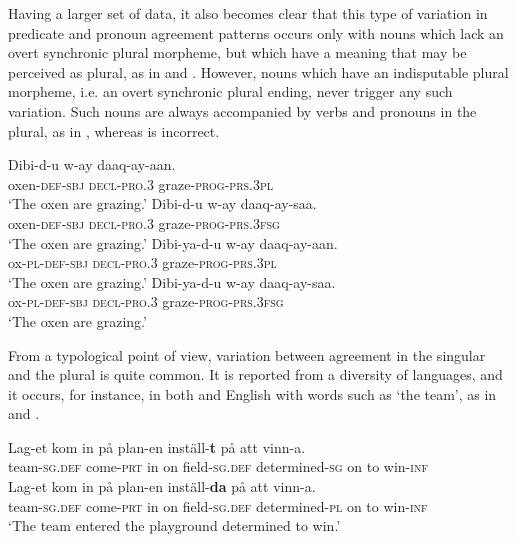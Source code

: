 \documentclass[output=paper]{langsci/langscibook}
\begin{document}
Having a larger set of data, it also becomes clear that this type of variation in predicate and pronoun agreement patterns occurs only with nouns which lack an overt synchronic  plural morpheme, but which have a meaning that may be perceived as plural, as in  and . However, nouns which have an indisputable plural morpheme, i.e. an overt synchronic  plural ending, never trigger any such variation. Such nouns are always accompanied by verbs and pronouns in the plural, as in , whereas  is incorrect.

\ea\label{ex:nilsson:4}
\ea\label{ex:nilsson:4a}
\gll Dibi-d-u     w-ay     daaq-ay-aan.\\
       oxen-\textsc{def-sbj}   \textsc{decl-pro.3}  graze-\textsc{prog-prs.3pl}\\
\glt ‘The oxen are grazing.’
\ex\label{ex:nilsson:4b}
\gll Dibi-d-u    w-ay    daaq-ay-saa.\\
       oxen\textsc{-def-sbj}   \textsc{decl-pro.3}  graze-\textsc{prog-prs.3fsg}\\
\glt ‘The oxen are grazing.’
\ex\label{ex:nilsson:4c}
\gll Dibi-ya-d-u    w-ay    daaq-ay-aan.\\
       ox\textsc{-pl-def-sbj}   \textsc{decl-pro.3}  graze-\textsc{prog-prs.3pl}\\
\glt ‘The oxen are grazing.’
\ex\label{ex:nilsson:4d}
\gll *Dibi-ya-d-u    w-ay    daaq-ay-saa.\\
       ox\textsc{-pl-def-sbj}    \textsc{decl-pro.3}  graze\textsc{-prog-prs.3fsg}\\
\glt ‘The oxen are grazing.’
\z
\z

From a typological point of view, variation between agreement in the singular and the plural is quite common. It is reported from a diversity of languages, and it occurs, for instance, in both  and English with words such as ‘the team’, as in  and .

\ea\label{ex:nilsson:5}
\ea 
\gll Lag-et           kom          in på plan-en        inställ-\textbf{t}            på att vinn-a.\\
       team-\textsc{sg.def} come-\textsc{prt} in on field-\textsc{sg.def} determined-\textsc{sg} on to  win-\textsc{inf}\\

\ex
\gll Lag-et           kom          in på plan-en        inställ-\textbf{da}        på att vinn-a.\\
       team-\textsc{sg.def}  come-\textsc{prt} in on field-\textsc{sg.def} determined-\textsc{pl} on to  win-\textsc{inf} \\
\glt ‘The team entered the playground determined to win.’
\z
\z
\end{document}
